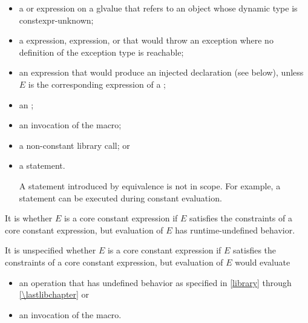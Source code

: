 \begin{itemize}
\begin{example}
\begin{codeblock}
constexpr std::initializer_list<int *> il1 = { (int *)nullptr };
constexpr std::initializer_list<unsigned long> il2 = { 0 };
constexpr bool b7 = il1.begin() == (void *)il2.begin();     // error: non-constant
\end{codeblock}
\end{example}

\item
a  or
 expression
on a glvalue that refers to an object
whose dynamic type is constexpr-unknown;

\item
a  expression,
 expression, or
that would throw an exception
where no definition of the exception type is reachable;

\item
an expression that would produce an injected declaration (see below),
unless $E$ is the corresponding expression of
a ;

\item
an ;

\item
an invocation of the  macro;

\item
a non-constant library call;
or

\item
a  statement.
\begin{note}
A  statement introduced by equivalence
is not in scope.
For example, a  statement
can be executed during constant evaluation.
\end{note}
\end{itemize}

\pnum
It is
whether $E$ is a core constant expression
if $E$ satisfies the constraints of a core constant expression, but
evaluation of $E$ has runtime-undefined behavior.

\pnum
It is unspecified whether $E$ is a core constant expression
if $E$ satisfies the constraints of a core constant expression, but
evaluation of $E$ would evaluate
\begin{itemize}
\item
an operation that has undefined behavior
as specified in \ref{library} through \ref{\lastlibchapter} or
\item
an invocation of the  macro.
\end{itemize}

